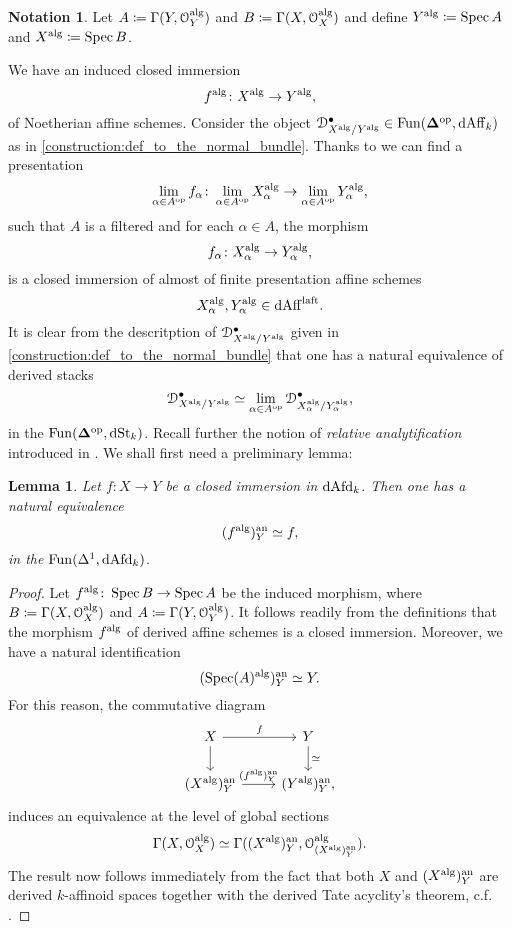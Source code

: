 \documentclass[10pt,a4paper,reqno]{amsart} %
\theoremstyle{plain}
\newtheorem{lem}[thm]{Lemma}
\theoremstyle{definition}
\newtheorem{notation}[thm]{Notation}
\theoremstyle{remark}
\numberwithin{equation}{section}
\begin{document}
\begin{notation}
    Let $A \coloneqq \Gamma(Y, \mathcal O_Y^\mathrm{alg})$ and $B \coloneqq \Gamma(X, \mathcal O_X^\mathrm{alg})$ and define $Y^\mathrm{alg} \coloneqq \operatorname{Spec} A$ and $X^\mathrm{alg} \coloneqq \operatorname{Spec} B$.
\end{notation}

We have an induced closed immersion
    \[
        f^\mathrm{alg} \colon X^\mathrm{alg} \to Y^\mathrm{alg},  
    \]
of Noetherian affine schemes. Consider the object $\mathcal D_{X^\mathrm{alg}/ Y^\mathrm{alg}}^\bullet \in \operatorname{Fun}(\bm{\Delta} ^\mathrm{op}, \mathrm{dAff}_k)$ as in \cref{construction:def_to_the_normal_bundle}.
Thanks to \cite[Proposition 4.6.1.3]{Lurie_SAG} we can find a presentation
    \[
        \lim_{\alpha \in A^\mathrm{op}} f_{\alpha } \colon \lim_{\alpha \in A^\mathrm{op}} X_\alpha^\mathrm{alg} \to \lim_{\alpha \in A^\mathrm{op}} Y_\alpha^\mathrm{alg},  
    \]
such that $A$ is a filtered \infcat and for each $\alpha \in A$, the morphism
    \[
        f_\alpha \colon X_\alpha^\mathrm{alg} \to Y_\alpha^\mathrm{alg},  
    \]
is a closed immersion of almost of finite presentation affine schemes
    \[X_\alpha^\mathrm{alg} , Y_\alpha^\mathrm{alg} \in \mathrm{dAff}^{\mathrm{laft}}.\]
It is clear from the descritption
of $\mathcal D_{X^\mathrm{alg}/Y^\mathrm{alg}}^\bullet$ given in \cref{construction:def_to_the_normal_bundle} that one has a natural equivalence of derived stacks
    \[
        \mathcal D_{X^\mathrm{alg}/Y^\mathrm{alg}}^\bullet \simeq \lim_{\alpha \in A^\mathrm{op}} \mathcal D_{X_\alpha^\mathrm{alg}/ Y_\alpha^\mathrm{alg}}^\bullet,
    \]
in the \infcat $\mathrm{Fun}(\bm{\Delta} ^\mathrm{op}, \mathrm{dSt}_k)$.
Recall further the notion of \emph{relative analytification} introduced in \cite[\S 6.1]{Porta_Yu_NQK}. We shall first need a preliminary lemma:

\begin{lem} \label{lem:relative_anlaytification_of_closed_immersions_are_compatible_with_alg_construction}
    Let $f \colon X \to Y$ be a closed immersion in $\mathrm{dAfd}_k$. Then one has a natural equivalence
        \[
            (f ^\mathrm{alg})^\mathrm{an}_Y \simeq f,  
        \]
    in the \infcat $\operatorname{Fun}(\Delta^1, \mathrm{dAfd}_k)$.
\end{lem}

\begin{proof}
    Let $f ^\mathrm{alg} \colon \operatorname{Spec} B \to \operatorname{Spec} A$ be the induced morphism, where $B \coloneqq \Gamma(X, \mathcal O_X^\mathrm{alg})$ and $A \coloneqq \Gamma(Y, \mathcal O_Y^\mathrm{alg})$. It follows readily from the definitions
    that the morphism $f^\mathrm{alg}$ of derived affine schemes is a closed immersion. Moreover,
    we have a natural
    identification
        \[(\operatorname{Spec}(A)^\mathrm{alg})^\mathrm{an}_Y \simeq Y.\]
    For this reason, the commutative diagram
        \[
        \begin{tikzcd}
            X \ar{r}{f} \ar{d} & Y \ar{d}{\simeq} \\
            (X\alg)\an_Y \ar{r}{(f\alg)\an_Y} & (Y\alg)\an_Y,  
        \end{tikzcd}
        \]
    induces
    an equivalence at the level of global sections
        \[
            \Gamma(X, \mathcal O_X^\mathrm{alg}) \simeq \Gamma((X^\mathrm{alg})_Y^\mathrm{an}, \mathcal O_{(X^\mathrm{alg})^\mathrm{an}_Y}^\mathrm{alg}).  
        \]
    The result now follows immediately from the fact that both $X$ and $(X^\mathrm{alg})_Y^\mathrm{an}$ are derived $k$-affinoid spaces together with the derived Tate acyclity's theorem,
    c.f. \cite[Theorem 3.1]{Porta_Yu_Derived_Hom_spaces}.
\end{proof}
\end{document}
